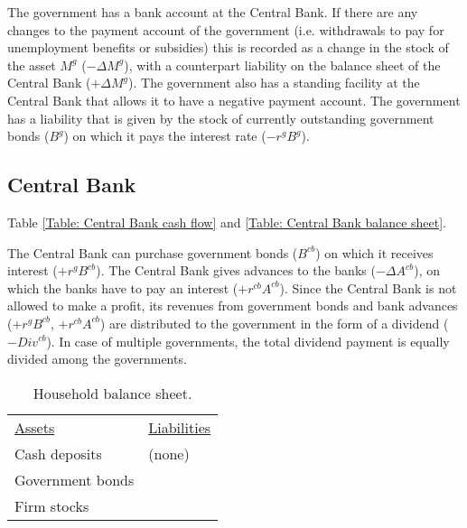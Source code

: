 The government has a bank account at the Central Bank. If there are any changes to the payment account of the government (i.e. withdrawals to pay for unemployment benefits or subsidies) this is recorded as a change in the stock of the asset $M^{g}$ ($-\Delta M^{g}$), with a counterpart liability on the balance sheet of the Central Bank ($+\Delta M^{g}$). The government also has a standing facility at the Central Bank that allows it to have a negative payment account. The government has a liability that is given by the stock of currently outstanding government bonds ($B^g$) on which it pays the interest rate ($-r^g B^g$).

\subsection{Central Bank}
Table \ref{Table: Central Bank cash flow} and \ref{Table: Central Bank balance sheet}.

The Central Bank can purchase government bonds ($B^{cb}$) on which it receives interest ($+r^{g}B^{cb}$).
The Central Bank gives advances to the banks ($-\Delta A^{cb}$), on which the banks have to pay an interest ($+r^{cb}A^{cb}$). Since the Central Bank is not allowed to make a profit, its revenues from government bonds and bank advances ($+r^{g}B^{cb}$, $+r^{cb}A^{cb}$) are distributed to the government in the form of a dividend ($-Div^{cb}$). In case of multiple governments, the total dividend payment is equally divided among the governments.

\clearpage
\begin{table}[H!]
\caption{Household balance sheet.}
\label{Table: Household balance sheet}\centering
\begin{boxedminipage}{14cm}
\centering\leavevmode
\begin{tabular}{ll}
\underline{Assets} & \underline{Liabilities} \\
Cash deposits & (none)\\
Government bonds &\\
Firm stocks &\\
\end{tabular}%
\end{boxedminipage}
\end{table}

